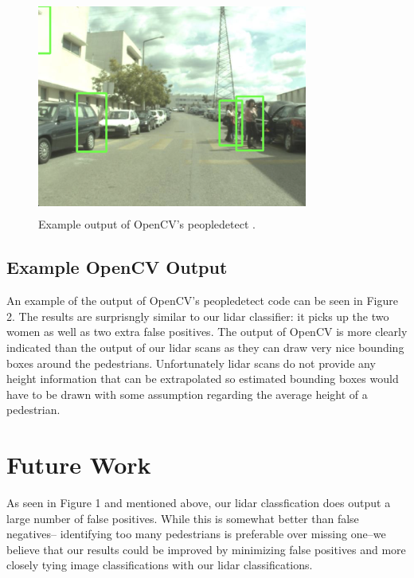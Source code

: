 \documentclass[10pt,twocolumn,letterpaper]{article}
\begin{document}
  \begin{figure}
    \includegraphics[height=2.8in, width=3.5in]{images/peopledetect.png}
    \caption{ Example output of OpenCV's peopledetect \cite{opencv}. }
  \end{figure}

  \subsection{Example OpenCV Output}
  An example of the output of OpenCV's peopledetect \cite{opencv} code can be seen in Figure 2.
  The results are surprisngly similar to our lidar classifier: it picks up the two
  women as well as two extra false positives. The output of OpenCV is more clearly
  indicated than the output of our lidar scans as they can draw very nice bounding
  boxes around the pedestrians. Unfortunately lidar scans do not provide any height
  information that can be extrapolated so estimated bounding boxes would have to be
  drawn with some assumption regarding the average height of a pedestrian.

\section{Future Work}
  As seen in Figure 1 and mentioned above, our lidar classfication does output a
  large number of false positives. While this is somewhat better than false negatives--
  identifying too many pedestrians is preferable over missing one--we believe that
  our results could be improved by minimizing false positives and more closely
  tying image classifications with our lidar classifications.
\end{document}
